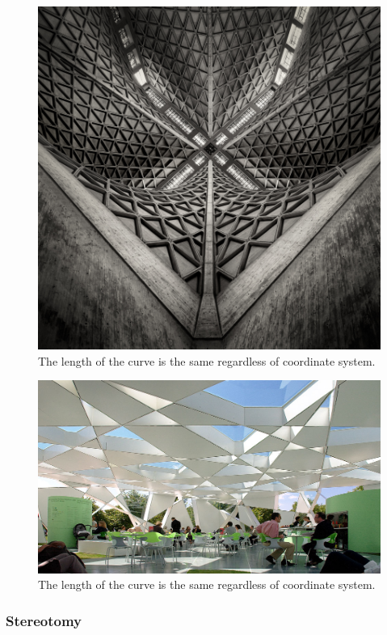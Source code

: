 \begin{figure}[H]
\centering
\includegraphics[width=0.9\linewidth ]{figure/Introduction/Nervi.jpg}

\caption{The length of the curve is the same regardless of coordinate system.}
\end{figure}


\begin{figure}[H]
\centering
\includegraphics[width=0.9\linewidth ]{figure/Introduction/ToyoIto.jpg}

\caption{The length of the curve is the same regardless of coordinate system.}
\end{figure}



\subsubsection{Stereotomy }
  
